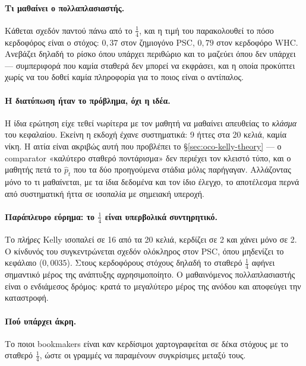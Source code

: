 \documentclass[12pt,a4paper,oneside]{report}
\renewcommand{\_}{\oldunderscore\allowbreak}
\theoremstyle{definition}
\theoremstyle{plain}
\theoremstyle{remark}
\begin{document}
\paragraph{Τι μαθαίνει ο πολλαπλασιαστής.} Κάθεται σχεδόν παντού πάνω από το $\tfrac14$, και
η τιμή του παρακολουθεί το πόσο κερδοφόρος είναι ο στόχος: $0{,}37$ στον ζημιογόνο PSC,
$0{,}79$ στον κερδοφόρο WHC. Ανεβάζει δηλαδή το ρίσκο
όπου υπάρχει περιθώριο και το μαζεύει όπου δεν υπάρχει --- συμπεριφορά που καμία σταθερά δεν
μπορεί να εκφράσει, και η οποία προκύπτει χωρίς να του δοθεί καμία πληροφορία για το ποιος
είναι ο αντίπαλος.

\paragraph{Η διατύπωση ήταν το πρόβλημα, όχι η ιδέα.} Η ίδια ερώτηση είχε τεθεί νωρίτερα με
τον μαθητή να μαθαίνει απευθείας το \emph{κλάσμα} του κεφαλαίου. Εκείνη η εκδοχή έχανε
συστηματικά: 9 ήττες στα 20 κελιά, καμία νίκη. Η αιτία είναι ακριβώς αυτή που προβλέπει το
\S\ref{sec:oco-kelly-theory} --- ο comparator «καλύτερο σταθερό ποντάρισμα» δεν περιέχει τον
κλειστό τύπο, και ο μαθητής πετά το $\hat{p}_t$ που τα δύο προηγούμενα στάδια μόλις
παρήγαγαν. Αλλάζοντας μόνο το τι μαθαίνεται, με τα ίδια δεδομένα και τον ίδιο έλεγχο, το
αποτέλεσμα περνά από συστηματική ήττα σε ισοπαλία με σημειακή υπεροχή.

\paragraph{Παράπλευρο εύρημα: το $\tfrac14$ είναι υπερβολικά συντηρητικό.} Το \emph{πλήρες}
Kelly ισοπαλεί σε 16 από τα 20 κελιά, κερδίζει σε 2 και χάνει μόνο σε 2. Ο κίνδυνός του
συγκεντρώνεται σχεδόν ολόκληρος στον PSC, όπου μηδενίζει το κεφάλαιο ($0{,}0035$). Στους κερδοφόρους
στόχους δηλαδή το σταθερό $\tfrac14$ αφήνει σημαντικό μέρος της ανάπτυξης αχρησιμοποίητο. Ο
μαθαινόμενος πολλαπλασιαστής είναι ο ενδιάμεσος δρόμος: κρατά το μεγαλύτερο μέρος της ανόδου
και αποφεύγει την καταστροφή.

\paragraph{Πού υπάρχει άκρη.} Το ποιοι bookmakers είναι καν κερδίσιμοι χαρτογραφείται σε δέκα
στόχους με το σταθερό $\tfrac14$, ώστε οι γραμμές να παραμένουν συγκρίσιμες μεταξύ τους.
\end{document}
